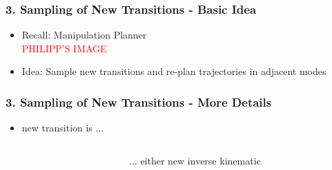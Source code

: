 \documentclass[12pt, %
			  t     %
]{beamer}%
\begin{document}
\begin{frame}
\frametitle{3. Sampling of New Transitions - Basic Idea}
\begin{itemize}
  \item Recall: Manipulation Planner\\ 
        \textcolor{red}{PHILIPP'S IMAGE}
  \item Idea: Sample new transitions and re-plan trajectories in adjacent modes
\end{itemize}


\end{frame}

\begin{frame}
\frametitle{3. Sampling of New Transitions - More Details}
\begin{itemize}
  \item new transition is ... 
  \begin{columns}[T]
    \begin{column}{.05\textwidth}
    \end{column}
    \begin{column}{.475\textwidth}
       \footnotesize{... either new inverse kinematic} \\ \vskip 0.3cm
       \centering {}
    \end{column}
\end{columns}
\end{itemize}
\end{frame}
\end{document}
